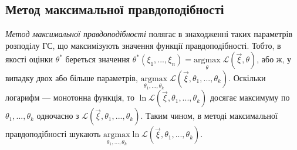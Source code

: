 \subsection{Метод максимальної правдоподібності}
\emph{Метод максимальної правдоподібності} полягає в знаходженні таких параметрів розподілу ГС, що максимізують значення функції правдоподібності.
Тобто, в якості оцінки $\theta^*$ береться значення $\theta^*(\xi_1, ..., \xi_n) = \underset{\theta}{\mathrm{argmax}} \;{\mathcal{L}(\vec{\xi}, \theta)}$, або ж, у випадку
двох або більше параметрів, $\underset{\theta_1, ..., \theta_k}{\mathrm{argmax}} \; {\mathcal{L}(\vec{\xi}, \theta_1, ..., \theta_k)}$. Оскільки логарифм --- монотонна функція,
то $\ln {\mathcal{L}(\vec{\xi}, \theta_1, ..., \theta_k)}$ досягає максимуму по $\theta_1, ..., \theta_k$ одночасно з ${\mathcal{L}(\vec{\xi}, \theta_1, ..., \theta_k)}$.
Таким чином, в методі максимальної правдоподібності шукають $\underset{\theta_1, ..., \theta_k}{\mathrm{argmax}} \ln{\mathcal{L}(\vec{\xi}, \theta_1, ..., \theta_k)}$.
